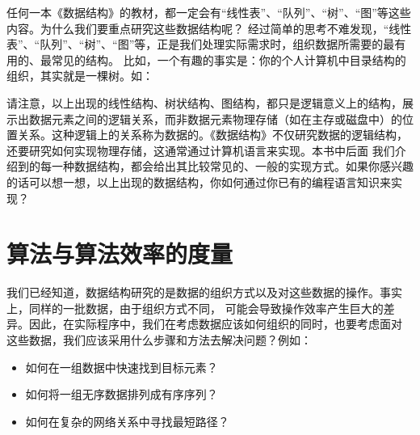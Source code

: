 任何一本《数据结构》的教材，都一定会有“线性表”、“队列”、“树”、“图”等这些内容。为什么我们要重点研究这些数据结构呢？
经过简单的思考不难发现，“线性表”、“队列”、“树”、“图”等，正是我们处理实际需求时，组织数据所需要的最有用的、最常见的结构。
比如，一个有趣的事实是：你的个人计算机中目录结构的组织，其实就是一棵树。如：
\begin{bulk}
\begin{center}
\end{center}
\end{bulk}
请注意，以上出现的线性结构、树状结构、图结构，都只是逻辑意义上的结构，展示出数据元素之间的逻辑关系，而非数据元素物理存储（如在主存或磁盘中）的位
置关系。这种逻辑上的关系称为数据的。《数据结构》不仅研究数据的逻辑结构，还要研究如何实现物理存储，这通常通过计算机语言来实现。本书中后面
我们介绍到的每一种数据结构，都会给出其比较常见的、一般的实现方式。如果你感兴趣的话可以想一想，以上出现的数据结构，你如何通过你已有的编程语言知识来实现？

\section{算法与算法效率的度量}
我们已经知道，数据结构研究的是数据的组织方式以及对这些数据的操作。事实上，同样的一批数据，由于组织方式不同，
可能会导致操作效率产生巨大的差异。因此，在实际程序中，我们在考虑数据应该如何组织的同时，也要考虑面对
这些数据，我们应该采用什么步骤和方法去解决问题？例如：
\begin{itemize}[itemsep=0pt,
    parsep=0pt,
    topsep=0pt]
    \item 如何在一组数据中快速找到目标元素？
    \item 如何将一组无序数据排列成有序序列？
    \item 如何在复杂的网络关系中寻找最短路径？
\end{itemize}

